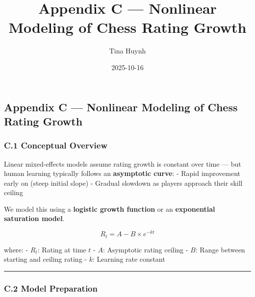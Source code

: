\documentclass[
]{article}
\title{Appendix C --- Nonlinear Modeling of Chess Rating Growth}
\author{Tina Huynh}
\date{2025-10-16}
\begin{document}
\maketitle

{
\setcounter{tocdepth}{2}
\tableofcontents
}
\subsection{Appendix C --- Nonlinear Modeling of Chess Rating
Growth}\label{appendix-c-nonlinear-modeling-of-chess-rating-growth}

\subsubsection{C.1 Conceptual Overview}\label{c.1-conceptual-overview}

Linear mixed-effects models assume rating growth is constant over time
--- but human learning typically follows an \textbf{asymptotic curve}: -
Rapid improvement early on (steep initial slope) - Gradual slowdown as
players approach their skill ceiling

We model this using a \textbf{logistic growth function} or an
\textbf{exponential saturation model}.

\[
R_t = A - B \times e^{-k t}
\]

where: - \(R_t\): Rating at time \(t\) - \(A\): Asymptotic rating
ceiling - \(B\): Range between starting and ceiling rating - \(k\):
Learning rate constant

\begin{center}\rule{0.5\linewidth}{0.5pt}\end{center}

\subsubsection{C.2 Model Preparation}\label{c.2-model-preparation}
\end{document}
